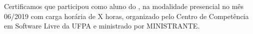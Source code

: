 Certificamos que {{\bfseries{}}}
participou como aluno do \course, na modalidade presencial no mês 06/2019
com carga horária de X horas, organizado pelo
Centro de Competência em Software Livre da UFPA e ministrado por MINISTRANTE.
